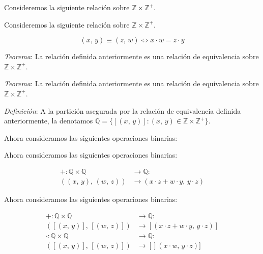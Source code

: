 \documentclass{beamer}
\newcommand{\pair}[2]{(#1,\, #2)}
\begin{document}
  \begin{frame}
    Consideremos la siguiente relación sobre $\mathbb{Z} \times \mathbb{Z}^+$.
  \end{frame}

  \begin{frame}
    Consideremos la siguiente relación sobre $\mathbb{Z} \times \mathbb{Z}^+$.

    \[\pair{x}{y} \equiv \pair{z}{w} \iff x \cdot w = z \cdot y\]
  \end{frame}

  \begin{frame}
    \textit{Teorema}: La relación definida anteriormente es una relación 
    de equivalencia sobre $\mathbb{Z} \times \mathbb{Z}^+$.

  \end{frame}

  \begin{frame}
    \textit{Teorema}: La relación definida anteriormente es una relación 
    de equivalencia sobre $\mathbb{Z} \times \mathbb{Z}^+$.
    \newline\newline

    \textit{Definición}: A la partición asegurada por la relación de equivalencia 
    definida anteriormente, la denotamos $\mathbb{Q} = \{[\pair{x}{y}]: \pair{x}{y} \in \mathbb{Z} \times \mathbb{Z}^+\}$.
  \end{frame}

  \begin{frame}
    Ahora consideramos las siguientes operaciones binarias:
  \end{frame}

  \begin{frame}
    Ahora consideramos las siguientes operaciones binarias:

    \begin{equation*}
      \begin{aligned}
        +: \mathbb{Q} \times \mathbb{Q} &\to \mathbb{Q}: \\
        \pair{\pair{x}{y}}{\pair{w}{z}} &\to \pair{x \cdot z + w \cdot y}{y \cdot z}
      \end{aligned}
    \end{equation*}
  \end{frame}

  \begin{frame}
    Ahora consideramos las siguientes operaciones binarias:

    \begin{equation*}
      \begin{aligned}
        +: \mathbb{Q} \times \mathbb{Q} &\to \mathbb{Q}: \\
        \pair{[\pair{x}{y}]}{[\pair{w}{z}]} &\to [\pair{x \cdot z + w \cdot y}{y \cdot z}]\\
        \cdot : \mathbb{Q} \times \mathbb{Q} &\to \mathbb{Q}: \\
        \pair{[\pair{x}{y}]}{[\pair{w}{z}]} &\to []\pair{x \cdot w}{y \cdot z}]
      \end{aligned}
    \end{equation*}
  \end{frame}
\end{document}
